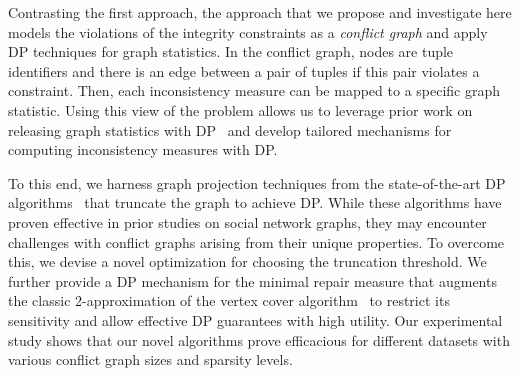 Contrasting the first approach, the approach that we propose and investigate here models the violations of the integrity constraints as a \emph{conflict graph} and apply DP techniques for graph statistics. In the conflict graph, nodes are tuple identifiers and there is an edge between a pair of tuples if this pair violates a constraint. 
Then, each inconsistency measure can be mapped to a specific graph statistic. 
Using this view of the problem allows us to leverage prior work on releasing graph statistics with DP~\cite{hay2009accurate,KasiviswanathanNRS13,day2016publishing} and develop tailored mechanisms for computing inconsistency measures with DP. 

To this end, we harness graph projection techniques from the state-of-the-art DP algorithms~\cite{day2016publishing} that truncate the graph to achieve DP. While these algorithms have proven effective in prior studies on social network graphs, they may encounter challenges with conflict graphs arising from their unique properties. To overcome this, we devise a novel optimization for choosing the truncation threshold. 
We further provide a DP mechanism for the minimal repair measure that augments the classic 2-approximation of the vertex cover algorithm~\cite{vazirani1997approximation} to restrict its sensitivity and allow effective DP guarantees with high utility. 
Our experimental study shows that our novel algorithms prove efficacious for different datasets with various conflict graph sizes and sparsity levels. 








